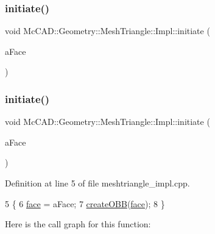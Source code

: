 \mbox{\label{classMcCAD_1_1Geometry_1_1MeshTriangle_1_1Impl_ae464fdf11ea0856674726c59760f423e}} 
\subsubsection{\texorpdfstring{initiate()}{initiate()}\hspace{0.1cm}{\footnotesize\ttfamily [1/2]}}
{\footnotesize\ttfamily void Mc\+C\+A\+D\+::\+Geometry\+::\+Mesh\+Triangle\+::\+Impl\+::initiate (\begin{DoxyParamCaption}\item[{const Topo\+D\+S\+\_\+\+Face \&}]{a\+Face }\end{DoxyParamCaption})}

\mbox{\label{classMcCAD_1_1Geometry_1_1MeshTriangle_1_1Impl_ae464fdf11ea0856674726c59760f423e}} 
\subsubsection{\texorpdfstring{initiate()}{initiate()}\hspace{0.1cm}{\footnotesize\ttfamily [2/2]}}
{\footnotesize\ttfamily void Mc\+C\+A\+D\+::\+Geometry\+::\+Mesh\+Triangle\+::\+Impl\+::initiate (\begin{DoxyParamCaption}\item[{const Topo\+D\+S\+\_\+\+Face \&}]{a\+Face }\end{DoxyParamCaption})}



Definition at line 5 of file meshtriangle\+\_\+impl.\+cpp.


\begin{DoxyCode}
5                                                                \{
6     \hyperlink{classMcCAD_1_1Geometry_1_1MeshTriangle_1_1Impl_a628b32616a5686ef5a83b90ac5bfc2b1}{face} = aFace;
7     \hyperlink{classMcCAD_1_1Geometry_1_1MeshTriangle_1_1Impl_a6fb5eafd5e28695aacedc93bdd9b7da3}{createOBB}(\hyperlink{classMcCAD_1_1Geometry_1_1MeshTriangle_1_1Impl_a628b32616a5686ef5a83b90ac5bfc2b1}{face});
8 \}
\end{DoxyCode}
Here is the call graph for this function\+:


